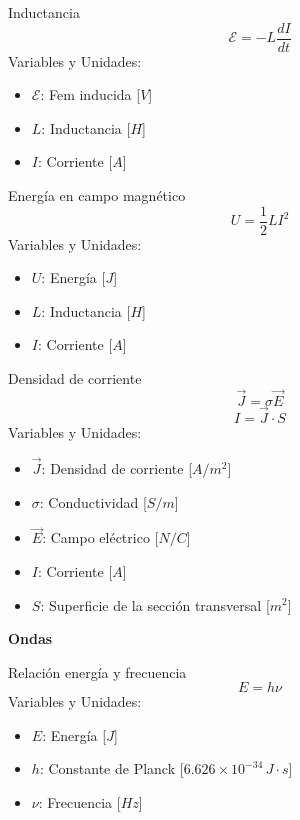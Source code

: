 \begin{landscape}
\begin{multicols}{3}
\begin{teorema}{Inductancia}
    $$\mathcal{E} = -L \frac{dI}{dt}$$
    Variables y Unidades:
    \begin{itemize}
        \item $\mathcal{E}$: Fem inducida [$V$]
        \item $L$: Inductancia [$H$]
        \item $I$: Corriente [$A$]
    \end{itemize}
\end{teorema}

\begin{teorema}{Energía en campo magnético}
    $$U = \frac{1}{2} L I^2$$
    Variables y Unidades:
    \begin{itemize}
        \item $U$: Energía [$J$]
        \item $L$: Inductancia [$H$]
        \item $I$: Corriente [$A$]
    \end{itemize}
\end{teorema}

\begin{teorema}{Densidad de corriente}
    $$\vec{J} = \sigma \vec{E}$$
    $$I = \vec{J} \cdot S$$
    Variables y Unidades:
    \begin{itemize}
        \item $\vec{J}$: Densidad de corriente [$A/m^2$]
        \item $\sigma$: Conductividad [$S/m$]
        \item $\vec{E}$: Campo eléctrico [$N/C$]
        \item $I$: Corriente [$A$]
        \item $S$: Superficie de la sección transversal [$m^2$]
    \end{itemize}
\end{teorema}

\end{multicols}

\newpage

\begin{center}
    \LARGE \textbf{Ondas}
\end{center}

\begin{multicols}{3}

\begin{teorema}{Relación energía y frecuencia}
    $$E = h \nu$$
    Variables y Unidades:
    \begin{itemize}
        \item $E$: Energía [$J$]
        \item $h$: Constante de Planck [$6.626 \times 10^{-34} \, J \cdot s$]
        \item $\nu$: Frecuencia [$Hz$]
    \end{itemize}
\end{teorema}


\end{multicols}
\end{landscape}
